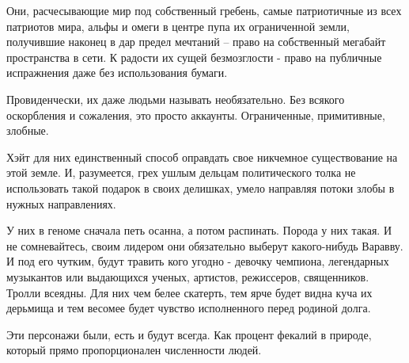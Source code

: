 Они, расчесывающие мир под собственный гребень, самые патриотичные из всех
патриотов мира, альфы и омеги в центре пупа их ограниченной земли, получившие
наконец в дар предел мечтаний – право на собственный мегабайт пространства в
сети. К радости их сущей безмозглости - право на публичные испражнения даже без
использования бумаги.

Провиденчески, их даже людьми называть необязательно. Без всякого оскорбления и
сожаления, это просто аккаунты. Ограниченные, примитивные, злобные.

Хэйт для них единственный способ оправдать свое никчемное существование на этой
земле. И, разумеется, грех ушлым дельцам политического толка не использовать
такой подарок в своих делишках, умело направляя потоки злобы в нужных
направлениях.

У них в геноме сначала петь осанна, а потом распинать. Порода у них такая. И не
сомневайтесь, своим лидером они обязательно выберут какого-нибудь Варавву. И
под его чутким, будут травить кого угодно - девочку чемпиона, легендарных
музыкантов или выдающихся ученых, артистов, режиссеров, священников. Тролли
всеядны. Для них чем белее скатерть, тем ярче будет видна куча их дерьмища и
тем весомее будет чувство исполненного перед родиной долга.

Эти персонажи были, есть и будут всегда. Как процент фекалий в природе, который
прямо пропорционален численности людей.

